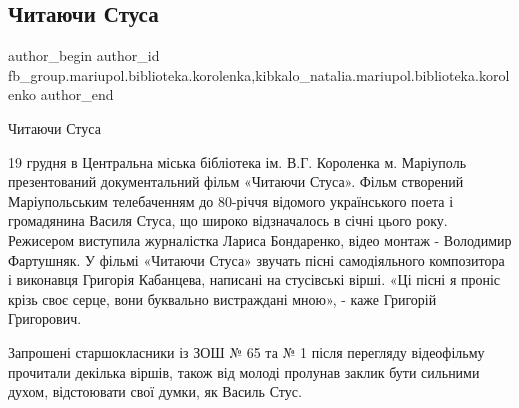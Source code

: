  
 
 
 
 

\subsection{Читаючи Стуса}
\label{sec:19_12_2018.fb.fb_group.mariupol.biblioteka.korolenka.1.chitayuchi_stusa}
 
\ifcmt
 author_begin
   author_id fb_group.mariupol.biblioteka.korolenka,kibkalo_natalia.mariupol.biblioteka.korolenko
 author_end
\fi

Читаючи Стуса 

19 грудня в Центральна міська бібліотека ім. В.Г. Короленка м. Маріуполь
презентований документальний фільм «Читаючи Стуса». Фільм створений
Маріупольським телебаченням до 80-річчя відомого українського поета і
громадянина Василя Стуса, що широко відзначалось в січні цього року. Режисером
виступила журналістка Лариса Бондаренко, відео монтаж - Володимир Фартушняк.  У
фільмі  «Читаючи Стуса» звучать  пісні самодіяльного композитора і виконавця
Григорія Кабанцева, написані на стусівські вірші. «Ці пісні я проніс крізь своє
серце, вони буквально вистраждані мною», - каже Григорій Григорович.

Запрошені старшокласники  із ЗОШ № 65 та № 1 після перегляду відеофільму
прочитали декілька віршів, також від молоді пролунав заклик бути сильними
духом, відстоювати свої думки, як Василь Стус.
